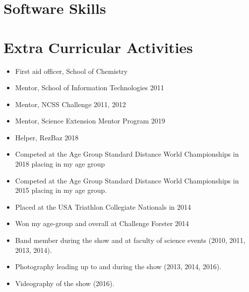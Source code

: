 \section{Software Skills}


\section{Extra Curricular Activities}

{%
  \begin{itemize}
    \item First aid officer, School of Chemistry
    \item Mentor, School of Information Technologies 2011
    \item Mentor, NCSS Challenge 2011, 2012
    \item Mentor, Science Extension Mentor Program 2019
    \item Helper, RezBaz 2018
  \end{itemize}
}
\vspace{1em}

{%
\begin{itemize}
  \item Competed at the Age Group Standard Distance World Championships in 2018 placing  in my age group
  \item Competed at the Age Group Standard Distance World Championships in 2015 placing  in my age group.
  \item Placed  at the USA Triathlon Collegiate Nationals in 2014
  \item Won my age-group and  overall at Challenge Forster 2014
\end{itemize}
}
\vspace{1em}

{%
\begin{itemize}
  \item Band member during the show and at faculty of science events (2010, 2011, 2013, 2014).
  \item Photography leading up to and during the show (2013, 2014, 2016).
  \item Videography of the show (2016).
\end{itemize}
}



